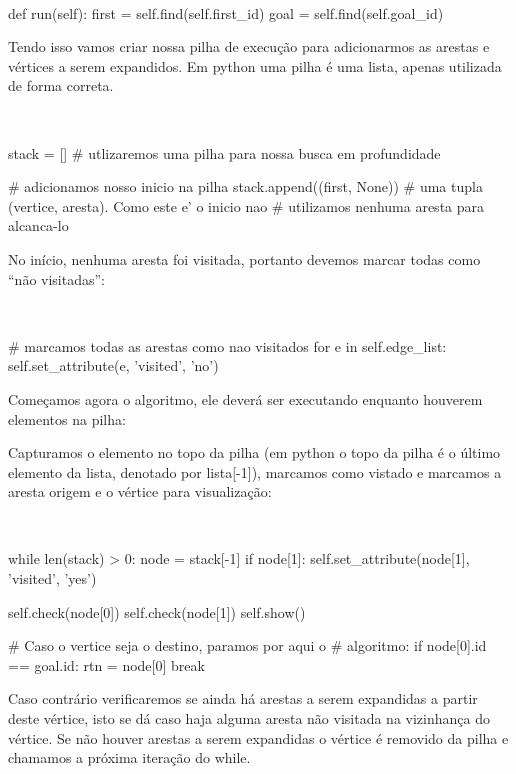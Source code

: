 \documentclass[a4paper]{abnt}
\begin{document}
\\
\begin{python}
    def run(self):
        first = self.find(self.first_id)
        goal = self.find(self.goal_id)
\end{python}

Tendo isso vamos criar nossa pilha de execução para adicionarmos as arestas e vértices a serem expandidos. Em python uma pilha é uma lista, apenas utilizada de forma correta.

\\
\begin{python}
        stack = [] # utlizaremos uma pilha para nossa busca em profundidade

        # adicionamos nosso inicio na pilha
        stack.append((first, None))
        # uma tupla (vertice, aresta). Como este e' o inicio nao
        # utilizamos nenhuma aresta para alcanca-lo
\end{python}

No início, nenhuma aresta foi visitada, portanto devemos marcar todas como “não visitadas”:

\\
\begin{python}
        # marcamos todas as arestas como nao visitados
        for e in self.edge_list:
            self.set_attribute(e, 'visited', 'no')
\end{python}

Começamos agora o algoritmo, ele deverá ser executando enquanto houverem elementos na pilha:

Capturamos o elemento no topo da pilha (em python o topo da pilha é o último elemento da lista, denotado por lista[-1]), marcamos como vistado e marcamos a aresta origem e o vértice para visualização:

\\
\begin{python}
        while len(stack) > 0:
            node = stack[-1]
            if node[1]:
                self.set_attribute(node[1], 'visited', 'yes')

            self.check(node[0])
            self.check(node[1])
            self.show()

            # Caso o vertice seja o destino, paramos por aqui o
            # algoritmo:
            if node[0].id == goal.id:
                rtn = node[0]
                break
\end{python}

    Caso contrário verificaremos se ainda há arestas a serem expandidas a partir deste vértice, isto se dá caso haja alguma aresta não visitada na vizinhança do vértice. Se não houver arestas a serem expandidas o vértice é removido da pilha e chamamos a próxima iteração do while.
\end{document}
